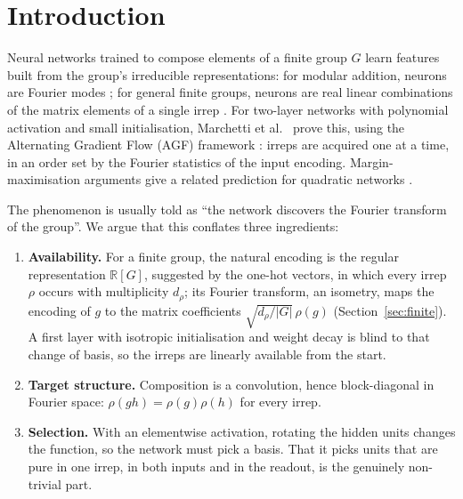 \documentclass[a4paper,11pt]{article}
\theoremstyle{remark}
\theoremstyle{definition}
\newcommand{\R}{\mathbb{R}}
\begin{document}
\section{Introduction}

Neural networks trained to compose elements of a finite group $G$ learn
features built from the group's irreducible representations: for modular
addition, neurons are Fourier modes \cite{nanda2023progress, gromov2023grokking,
zhong2023clock}; for general finite groups, neurons are real linear
combinations of the matrix elements of a single irrep \cite{chughtai2023toy,
stander2024cosets}. For two-layer networks with polynomial activation and small
initialisation, Marchetti et al.\ \cite{marchetti2026sequential} prove this,
using the Alternating Gradient Flow (AGF) framework \cite{kunin2025agf}: irreps
are acquired one at a time, in an order set by the Fourier statistics of the
input encoding. Margin-maximisation arguments give a related prediction for
quadratic networks \cite{morwani2023feature}.

The phenomenon is usually told as ``the network discovers the Fourier transform
of the group''. We argue that this conflates three ingredients:
\begin{enumerate}
\item \textbf{Availability.} For a finite group, the natural encoding is the
  regular representation $\R[G]$, suggested by the one-hot vectors, in which every
  irrep $\rho$ occurs with multiplicity $d_\rho$; its Fourier transform, an
  isometry, maps the encoding of $g$ to the matrix coefficients
  $\sqrt{d_\rho/|G|}\,\rho(g)$ (Section~\ref{sec:finite}). A first layer with
  isotropic initialisation and weight decay is blind to that change of basis, so
  the irreps are linearly available from the start.
\item \textbf{Target structure.} Composition is a convolution, hence
  block-diagonal in Fourier space: $\rho(gh)=\rho(g)\rho(h)$ for every irrep.
\item \textbf{Selection.} With an elementwise activation, rotating the hidden
  units changes the function, so the network must pick a basis. That it picks
  units that are pure in one irrep, in both inputs and in the readout, is the
  genuinely non-trivial part.
\end{enumerate}
\end{document}
